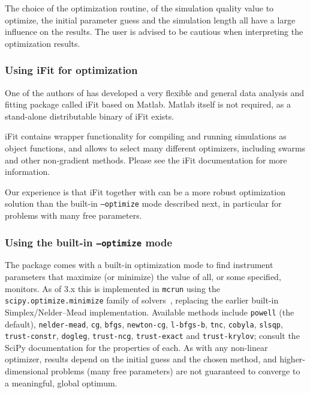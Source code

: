 The choice of the optimization routine, of the simulation quality value to
optimize, the initial parameter guess and the simulation length all have a large
influence on the results.  The user is advised to be cautious when interpreting
the optimization results.

\subsubsection{Using iFit for optimization}

One of the authors of \MCS has developed a very flexible and general data
analysis and fitting package called iFit \cite{iFit,iFit_web} based on
Matlab. Matlab itself is not required, as a stand-alone distributable binary of
iFit exists.

iFit contains wrapper functionality for compiling and running \MCS simulations
as object functions, and allows to select many different optimizers, including
swarms and other non-gradient methods. Please see the iFit documentation for
more information.

Our experience is that iFit together with \MCS can be a more robust optimization
solution than the \MCS built-in \texttt{--optimize} mode described next, in
particular for problems with many free parameters.

\subsubsection{Using the built-in \texttt{--optimize} mode}
\label{s:optimize-builtin}

The \MCS package comes with a built-in optimization mode to find
instrument parameters that maximize (or minimize) the value of all, or
some specified, monitors. As of \MCS 3.x this is implemented in
\texttt{mcrun} using the \texttt{scipy.optimize.minimize} family of
solvers~\cite{scipy_webpage}, replacing the earlier built-in Simplex/Nelder--Mead
implementation. Available methods include \texttt{powell} (the default),
\texttt{nelder-mead}, \texttt{cg}, \texttt{bfgs}, \texttt{newton-cg},
\texttt{l-bfgs-b}, \texttt{tnc}, \texttt{cobyla}, \texttt{slsqp},
\texttt{trust-constr}, \texttt{dogleg}, \texttt{trust-ncg},
\texttt{trust-exact} and \texttt{trust-krylov}; consult the SciPy
documentation for the properties of each. As with any non-linear
optimizer, results depend on the initial guess and the chosen method, and
higher-dimensional problems (many free parameters) are not guaranteed to
converge to a meaningful, global optimum.

